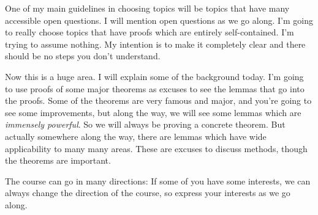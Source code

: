 One of my main guidelines in choosing topics will be topics that have many accessible open questions. I will mention open questions as we go along. I'm going to really choose topics that have proofs which are entirely self-contained. I'm trying to assume nothing. My intention is to make it completely clear and there should be no steps you don't understand. 

Now this is a huge area. I will explain some of the background today. I'm going to use proofs of some major theorems as excuses to see the lemmas that go into the proofs. Some of the theorems are very famous and major, and you're going to see some improvements, but along the way, we will see some lemmas which are \emph{immensely powerful}. So we will always be proving a concrete theorem. But actually somewhere along the way, there are lemmas which have wide applicability to many many areas. These are excuses to discuss methods, though the theorems are important. 

The course can go in many directions: If some of you have some interests, we can always change the direction of the course, so express your interests as we go along. 































%

%
%

\printnomenclature
\printindex
